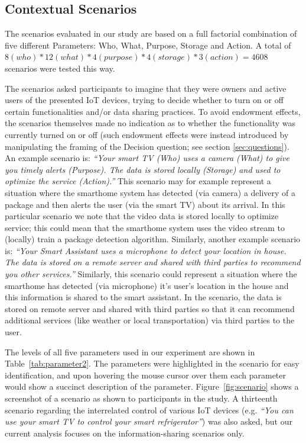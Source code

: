 \subsection{Contextual Scenarios}
The scenarios evaluated in our study are based on a full factorial combination of five different Parameters: Who, What, Purpose, Storage and Action. A total of $8(who)*12(what)*4(purpose)*4(storage)*3(action) = 4608$ scenarios were tested this way. 

The scenarios asked participants to imagine that they were owners and active users of the presented IoT devices, trying to decide whether to turn on or off certain functionalities and/or data sharing practices. To avoid endowment effects, the scenarios themselves made no indication as to whether the functionality was currently turned on or off (such endowment effects were instead introduced by manipulating the framing of the Decision question; see section \ref{sec:questions}). An example scenario is: \emph{``Your smart TV (Who) uses a camera (What) to give you timely alerts (Purpose). The data is stored locally (Storage) and used to optimize the service (Action).''} This scenario may for example represent a situation where the smarthome system has detected (via camera) a delivery of a package and then alerts the user (via the smart TV) about its arrival. In this particular scenario we note that the video data is stored locally to optimize service; this could mean that the smarthome system uses the video stream to (locally) train a package detection algorithm. Similarly, another example scenario is: \emph{``Your Smart Assistant uses a microphone to detect your location in house. The data is stored on a remote server and shared with third parties to recommend you other services.''} Similarly, this scenario could represent a situation where the smarthome has detected (via microphone) it's user's location in the house and this information is shared to the smart assistant. In the scenario, the data is stored on remote server and shared with third parties so that it can recommend additional services (like weather or local transportation) via third parties to the user.

The levels of all five parameters used in our experiment are shown in Table~\ref{tab:parameter2}. The parameters were highlighted in the scenario for easy identification, and upon hovering the mouse cursor over them each parameter would show a succinct description of the parameter. Figure~\ref{fig:scenario} shows a screenshot of a scenario as shown to participants in the study. A thirteenth scenario regarding the interrelated control of various IoT devices (e.g. \emph{``You can use your smart TV to control your smart refrigerator''}) was also asked, but our current analysis focuses on the information-sharing scenarios only.


